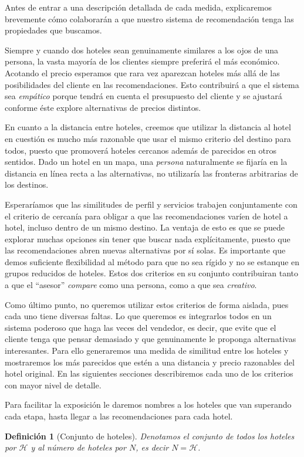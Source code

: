 \documentclass[12pt]{report}
\newcommand{\HH}{\mathcal{H}}
\newtheorem{defn}{Definici\'on}[chapter]
\begin{document}
Antes de entrar a una descripción detallada de cada medida, explicaremos brevemente cómo colaborarán a que nuestro sistema de recomendación tenga las propiedades que buscamos.

Siempre y cuando dos hoteles sean genuinamente similares a los ojos de una persona, la vasta mayoría de los clientes siempre preferirá el más económico. Acotando el precio esperamos que rara vez aparezcan hoteles más allá de las posibilidades del cliente en las recomendaciones. Esto contribuirá a que el sistema sea \emph{empático} porque tendrá en cuenta el presupuesto del cliente y se ajustará conforme éste explore alternativas de precios distintos.

En cuanto a la distancia entre hoteles, creemos que utilizar la distancia al hotel en cuestión es mucho más razonable que usar el mismo criterio del destino para todos, puesto que promoverá hoteles cercanos además de parecidos en otros sentidos. Dado un hotel en un mapa, una \emph{persona} naturalmente se fijaría en la distancia en línea recta a las alternativas, no utilizaría las fronteras arbitrarias de los destinos.

Esperaríamos que las similitudes de perfil y servicios trabajen conjuntamente con el criterio de cercanía para obligar a que las recomendaciones varíen de hotel a hotel, incluso dentro de un mismo destino. La ventaja de esto es que se puede explorar muchas opciones sin tener que buscar nada explícitamente, puesto que las recomendaciones abren nuevas alternativas por sí solas. Es importante que demos suficiente flexibilidad al método para que no sea rígido y no se estanque en grupos reducidos de hoteles. Estos dos criterios en su conjunto contribuiran tanto a que el ``asesor'' \emph{compare} como una persona, como a que sea \emph{creativo}.

Como último punto, no queremos utilizar estos criterios de forma aislada, pues cada uno tiene diversas faltas. Lo que queremos es integrarlos todos en un sistema poderoso que haga las veces del vendedor, es decir, que evite que el cliente tenga que pensar demasiado y que genuinamente le proponga alternativas interesantes. Para ello generaremos una medida de similitud entre los hoteles y mostraremos los más parecidos que estén a una distancia y precio razonables del hotel original. En las siguientes secciones describiremos cada uno de los criterios con mayor nivel de detalle.

Para facilitar la exposición le daremos nombres a los hoteles que van superando cada etapa, hasta llegar a las recomendaciones para cada hotel.
\begin{defn}[Conjunto de hoteles]
Denotamos el conjunto de todos los hoteles por $\HH$ y al número de hoteles por $N$, es decir $N = \HH$.
\end{defn}
\end{document}
